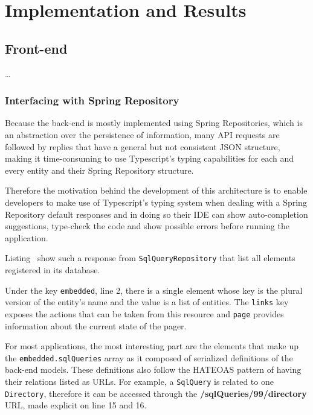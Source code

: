 \chapter{Implementation and Results}\label{cha:implementation}

\section{Front-end}\label{cha:implementation:sec:front-end}
\dots

\subsection{Interfacing with Spring Repository}
Because the back-end is mostly implemented using Spring Repositories, which is an abstraction over the persistence of information, many \gls{API} requests are followed by replies that have a general but not consistent \gls{JSON} structure, making it time-consuming to use Typescript's typing capabilities for each and every entity and their Spring Repository structure.

Therefore the motivation behind the development of this architecture is to enable developers to make use of Typescript's typing system when dealing with a Spring Repository default responses and in doing so their \gls{IDE} can show auto-completion suggestions, type-check the code and show possible errors before running the application.

Listing~\cite{code:json} show such a response from \texttt{SqlQueryRepository} that list all elements registered in its database.

Under the key \texttt{\textunderscore embedded}, line 2, there is a single element whose key is the plural version of the entity's name and the value is a list of entities. The \texttt{\textunderscore links} key exposes the actions that can be taken from this resource and \texttt{page} provides information about the current state of the pager.

For most applications, the most interesting part are the elements that make up the \texttt{\textunderscore embedded.sqlQueries} array as it composed of serialized definitions of the back-end models. These definitions also follow the \gls{HATEOAS} pattern of having their relations listed as \gls{URL}s. For example, a \texttt{SqlQuery} is related to one \texttt{Directory},  therefore it can be accessed through the \textbf{/sqlQueries/99/directory} \gls{URL}, made explicit on line 15 and 16.

